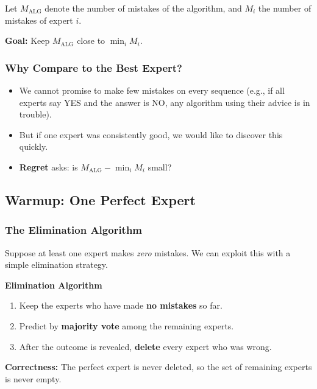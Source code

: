 Let $M_{\mathrm{ALG}}$ denote the number of mistakes of the algorithm, and $M_i$ the number of mistakes of expert $i$.

\textbf{Goal:} Keep $M_{\mathrm{ALG}}$ close to $\min_i M_i$.

\subsubsection{Why Compare to the Best Expert?}

\begin{itemize}
  \item We cannot promise to make few mistakes on every sequence (e.g., if all experts say YES and the answer is NO, any algorithm using their advice is in trouble).
  \item But if one expert was consistently good, we would like to discover this quickly.
  \item \textbf{Regret} asks: is $M_{\mathrm{ALG}} - \min_i M_i$ small?
\end{itemize}

\subsection{Warmup: One Perfect Expert}

\subsubsection{The Elimination Algorithm}

Suppose at least one expert makes \emph{zero} mistakes. We can exploit this with a simple elimination strategy.

\begin{mdframed}[backgroundcolor=lightblue, linecolor=keyblue, linewidth=1pt]
\textbf{Elimination Algorithm}
\begin{enumerate}
  \item Keep the experts who have made \textbf{no mistakes} so far.
  \item Predict by \textbf{majority vote} among the remaining experts.
  \item After the outcome is revealed, \textbf{delete} every expert who was wrong.
\end{enumerate}
\end{mdframed}

\textbf{Correctness:} The perfect expert is never deleted, so the set of remaining experts is never empty.

